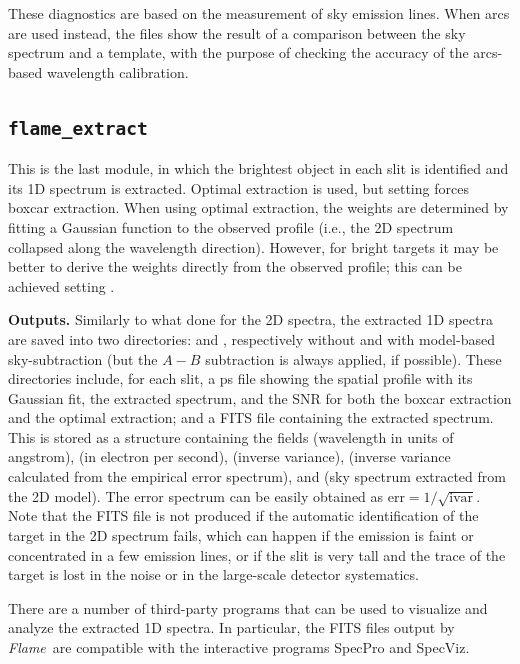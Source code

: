 \documentclass[a4paper]{article}
\newcommand{\flame}{\emph{Flame}}
\begin{document}
\begin{sloppypar}
These diagnostics are based on the measurement of sky emission lines. When arcs are used instead, the files show the result of a comparison between the sky spectrum and a template, with the purpose of checking the accuracy of the arcs-based wavelength calibration.



\subsection{\texttt{flame\_extract}}
\label{sec:extract}

This is the last module, in which the brightest object in each slit is identified and its 1D spectrum is extracted. Optimal extraction is used, but setting  forces boxcar extraction. When using optimal extraction, the weights are determined by fitting a Gaussian function to the observed profile (i.e., the 2D spectrum collapsed along the wavelength direction). However, for bright targets it may be better to derive the weights directly from the observed profile; this can be achieved setting .

\medskip
\noindent
\textbf{Outputs.} Similarly to what done for the 2D spectra, the extracted 1D spectra are saved into two directories:  and , respectively without and with model-based sky-subtraction (but the $A-B$ subtraction is always applied, if possible). These directories include, for each slit, a ps file showing the spatial profile with its Gaussian fit, the extracted spectrum, and the SNR for both the boxcar extraction and the optimal extraction; and a FITS file containing the extracted spectrum. This is stored as a structure containing the fields  (wavelength in units of angstrom),  (in electron per second),  (inverse variance),  (inverse variance calculated from the empirical error spectrum), and  (sky spectrum extracted from the 2D model). The error spectrum can be easily obtained as $\mathrm{err} = 1/\sqrt{\mathrm{ivar}}$. Note that the FITS file is not produced if the automatic identification of the target in the 2D spectrum fails, which can happen if the emission is faint or concentrated in a few emission lines, or if the slit is very tall and the trace of the target is lost in the noise or in the large-scale detector systematics.

There are a number of third-party programs that can be used to visualize and analyze the extracted 1D spectra. In particular, the FITS files output by \flame\ are compatible with the interactive programs SpecPro and SpecViz.


\end{sloppypar}
\end{document}
